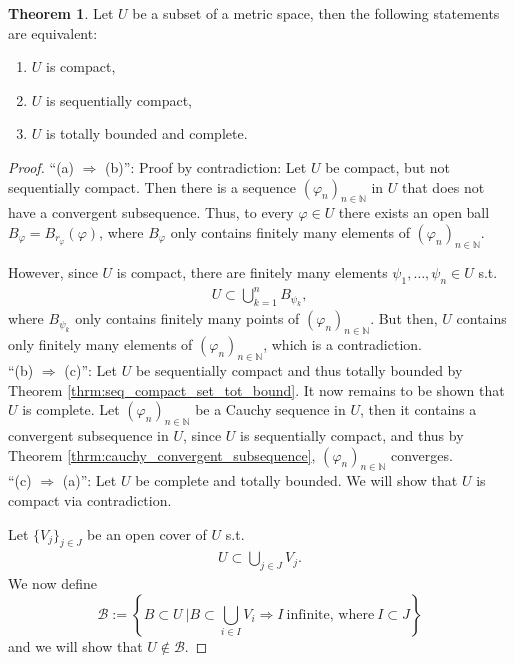 \documentclass[12pt, a4paper]{article}
\numberwithin{equation}{section}
\theoremstyle{definition}
\theoremstyle{definition}
\newtheorem{theorem}[thm]{Theorem}
\newcommand{\seq}[1][\varphi]{\left( #1 \right)_{n \in \mathbb{N}}}
\begin{document}
	\begin{theorem}\label{thrm:compact_seq_totally_bound_compl}
		Let $U$ be a subset of a metric space, then the following statements are equivalent:
		\begin{enumerate}[label=(\alph*)]
			\item $U$ is compact, 
			\item $U$ is sequentially compact,
			\item $U$ is totally bounded and complete.
		\end{enumerate}
	\end{theorem}

	\begin{proof}
		\enquote{(a) $\Longrightarrow$ (b)}: Proof by contradiction: Let $U$ be compact, but not sequentially compact. Then there is a sequence $\seq[\varphi_n]$ in $U$ that does not have a convergent subsequence. Thus, to every $\varphi\in U$ there exists an open ball $B_{\varphi} = B_{r_\varphi}(\varphi)$, where $B_{\varphi}$ only contains finitely many elements of $\seq[\varphi_n]$.
		
		However, since $U$ is compact, there are finitely many elements $\psi_1, \dots, \psi_n\in U$ s.t. 
		\begin{align*}
			U \subset \bigcup_{k=1}^{n}B_{\psi_k}, 
		\end{align*}
		where $B_{\psi_k}$ only contains finitely many points of $\seq[\varphi_n]$. But then, $U$ contains only finitely many elements of $\seq[\varphi_n]$, which is a contradiction.
		\\
		
		\enquote{(b) $\Longrightarrow$ (c)}: Let $U$ be sequentially compact and thus totally bounded by Theorem \eqref{thrm:seq_compact_set_tot_bound}. It now remains to be shown that $U$ is complete. Let $\seq[\varphi_n]$ be a Cauchy sequence in $U$, then it contains a convergent subsequence in $U$, since $U$ is sequentially compact, and thus by Theorem \ref{thrm:cauchy_convergent_subsequence}, $\seq[\varphi_n]$ converges.
		\\
		
		\enquote{(c) $\Longrightarrow$ (a)}: Let $U$ be complete and totally bounded. We will show that $U$ is compact via contradiction.
		
		Let $\{V_j\}_{j\in J}$ be an open cover of $U$ s.t. 
		\begin{align}\label{eq:open_cover}
			U\subset \bigcup_{j\in J}V_j.
		\end{align}
		We now define
		$$\mathcal B := \left\{ \left.B\subset U\ \right\vert B\subset \bigcup_{i\in I}V_i\Rightarrow I\ \text{infinite, where}\ I \subset J \right\}$$
		and we will show that $U\notin \mathcal B$.
		

\end{proof}
\end{document}
